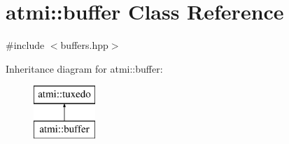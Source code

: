 \hypertarget{classatmi_1_1buffer}{}\section{atmi\+:\+:buffer Class Reference}
\label{classatmi_1_1buffer}


{\ttfamily \#include $<$buffers.\+hpp$>$}

Inheritance diagram for atmi\+:\+:buffer\+:\begin{figure}[H]
\begin{center}
\leavevmode
\includegraphics[height=2.000000cm]{classatmi_1_1buffer}
\end{center}
\end{figure}
